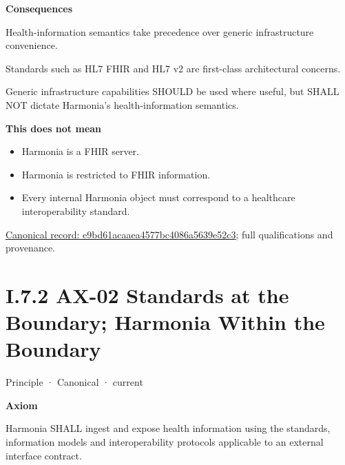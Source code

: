 \par\medskip\textbf{Consequences}\par


Health-information semantics take precedence over generic infrastructure
convenience.



Standards such as HL7 FHIR and HL7 v2 are first-class architectural
concerns.



Generic infrastructure capabilities SHOULD be used where useful, but
SHALL NOT dictate Harmonia's health-information semantics.



\textbf{This does not mean}



\begin{itemize}


\item Harmonia is a FHIR server.

\item Harmonia is restricted to FHIR information.

\item Every internal Harmonia object must correspond to a healthcare interoperability standard.

\end{itemize}

{\footnotesize \href{../../../../continuum/motivation/principle/e9bd61acaaea4577bc4086a5639e52c3.md}{Canonical record: e9bd61acaaea4577bc4086a5639e52c3}; full qualifications and provenance.}\par
\section*{I.7.2 AX-02 Standards at the Boundary; Harmonia Within the Boundary}
\label{navigation:I.7.2}

\label{element:eee8c3783d964d18a7f9dcea85fcd4cf}
{\small Principle · Canonical · current}\par

\par\medskip\textbf{Axiom}\par


Harmonia SHALL ingest and expose health information using the standards,
information models and interoperability protocols applicable to an
external interface contract.



